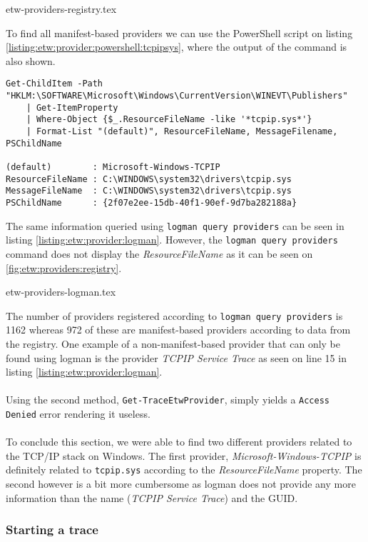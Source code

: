 \documentclass{report}
\begin{document}
{etw-providers-registry.tex}

To find all manifest-based providers we can use the PowerShell script on listing \ref{listing:etw:provider:powershell:tcpipsys}, where the output of the command is also shown.

\begin{listing}[H]
\begin{verbatim}
Get-ChildItem -Path "HKLM:\SOFTWARE\Microsoft\Windows\CurrentVersion\WINEVT\Publishers"
    | Get-ItemProperty
    | Where-Object {$_.ResourceFileName -like '*tcpip.sys*'}
    | Format-List "(default)", ResourceFileName, MessageFilename, PSChildName

(default)        : Microsoft-Windows-TCPIP
ResourceFileName : C:\WINDOWS\system32\drivers\tcpip.sys
MessageFileName  : C:\WINDOWS\system32\drivers\tcpip.sys
PSChildName      : {2f07e2ee-15db-40f1-90ef-9d7ba282188a}
\end{verbatim}
\caption{\texttt{logman query providers} output. See appendix \ref{appendix:etw-providers} for full output}
\label{listing:etw:provider:powershell:tcpipsys}
\end{listing}

The same information queried using \texttt{logman query providers} can be seen in listing \ref{listing:etw:provider:logman}. However, the \texttt{logman query providers} command does not display the \emph{ResourceFileName} as it can be seen on \autoref{fig:etw:providers:registry}.

{etw-providers-logman.tex}

The number of providers registered according to \texttt{logman query providers} is 1162 whereas 972 of these are manifest-based providers according to data from the registry. One example of a non-manifest-based provider that can only be found using logman is the provider \emph{TCPIP Service Trace} as seen on line 15 in listing \ref{listing:etw:provider:logman}.
\\
\\
Using the second method, \texttt{Get-TraceEtwProvider}, simply yields a \texttt{Access Denied} error rendering it useless.
\\
\\
To conclude this section, we were able to find two different providers related to the TCP/IP stack on Windows. The first provider, \emph{Microsoft-Windows-TCPIP} is definitely related to \texttt{tcpip.sys} according to the \emph{ResourceFileName} property. The second however is a bit more cumbersome as logman does not provide any more information than the name (\emph{TCPIP Service Trace}) and the GUID.

\subsubsection{Starting a trace}
\end{document}
